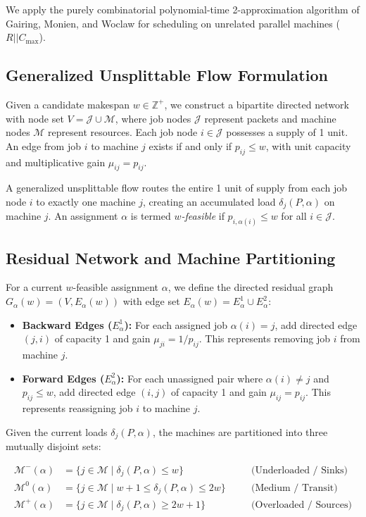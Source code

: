 \documentclass{article}
\begin{document}
We apply the purely combinatorial polynomial-time 2-approximation algorithm of Gairing, Monien, and Woclaw \cite{gairing2007faster} for scheduling on unrelated parallel machines ($R || C_{\max}$).

\subsection{Generalized Unsplittable Flow Formulation}
Given a candidate makespan $w \in \mathbb{Z}^+$, we construct a bipartite directed network with node set $V = \mathcal{J} \cup \mathcal{M}$, where job nodes $\mathcal{J}$ represent packets and machine nodes $\mathcal{M}$ represent resources.
Each job node $i \in \mathcal{J}$ possesses a supply of 1 unit. An edge from job $i$ to machine $j$ exists if and only if $p_{ij} \le w$, with unit capacity and multiplicative gain $\mu_{ij} = p_{ij}$. 

A generalized unsplittable flow routes the entire 1 unit of supply from each job node $i$ to exactly one machine $j$, creating an accumulated load $\delta_j(P, \alpha)$ on machine $j$. An assignment $\alpha$ is termed \emph{$w$-feasible} if $p_{i, \alpha(i)} \le w$ for all $i \in \mathcal{J}$.

\subsection{Residual Network and Machine Partitioning}
For a current $w$-feasible assignment $\alpha$, we define the directed residual graph $G_\alpha(w) = (V, E_\alpha(w))$ with edge set $E_\alpha(w) = E_\alpha^1 \cup E_\alpha^2$:
\begin{itemize}
    \item \textbf{Backward Edges ($E_\alpha^1$):} For each assigned job $\alpha(i) = j$, add directed edge $(j, i)$ of capacity 1 and gain $\mu_{ji} = 1/p_{ij}$. This represents removing job $i$ from machine $j$.
    \item \textbf{Forward Edges ($E_\alpha^2$):} For each unassigned pair where $\alpha(i) \neq j$ and $p_{ij} \le w$, add directed edge $(i, j)$ of capacity 1 and gain $\mu_{ij} = p_{ij}$. This represents reassigning job $i$ to machine $j$.
\end{itemize}

Given the current loads $\delta_j(P, \alpha)$, the machines are partitioned into three mutually disjoint sets:
\begin{definition}
\label{def:partitions}
\begin{align}
\mathcal{M}^-(\alpha) &= \{ j \in \mathcal{M} \mid \delta_j(P, \alpha) \le w \} \quad && \text{(Underloaded / Sinks)} \\
\mathcal{M}^0(\alpha) &= \{ j \in \mathcal{M} \mid w + 1 \le \delta_j(P, \alpha) \le 2w \} \quad && \text{(Medium / Transit)} \\
\mathcal{M}^+(\alpha) &= \{ j \in \mathcal{M} \mid \delta_j(P, \alpha) \ge 2w + 1 \} \quad && \text{(Overloaded / Sources)}
\end{align}
\end{definition}
\end{document}
